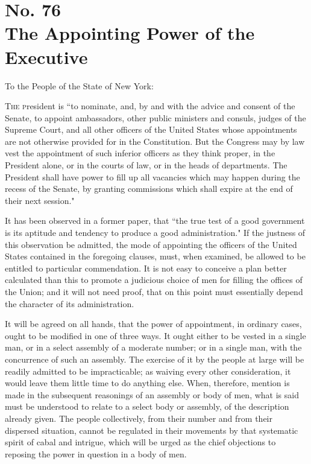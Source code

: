 \chapter[No. 76: The Appointing Power of the Executive]{No. 76\\ {\small The Appointing Power of the Executive}}
To the People of the State of New York:
\vspace{.25cm}

\textsc{The p}resident is ``to nominate, and, by and with the advice and consent of the Senate, to appoint ambassadors, other public ministers and consuls, judges of the Supreme Court, and all other officers of the United States whose appointments are not otherwise provided for in the Constitution. But the Congress may by law vest the appointment of such inferior officers as they think proper, in the President alone, or in the courts of law, or in the heads of departments. The President shall have power to fill up all vacancies which may happen during the recess of the Senate, by granting commissions which shall expire at the end of their next session."

It has been observed in a former paper, that ``the true test of a good government is its aptitude and tendency to produce a good administration." If the justness of this observation be admitted, the mode of appointing the officers of the United States contained in the foregoing clauses, must, when examined, be allowed to be entitled to particular commendation. It is not easy to conceive a plan better calculated than this to promote a judicious choice of men for filling the offices of the Union; and it will not need proof, that on this point must essentially depend the character of its administration.

It will be agreed on all hands, that the power of appointment, in ordinary cases, ought to be modified in one of three ways. It ought either to be vested in a single man, or in a select assembly of a moderate number; or in a single man, with the concurrence of such an assembly. The exercise of it by the people at large will be readily admitted to be impracticable; as waiving every other consideration, it would leave them little time to do anything else. When, therefore, mention is made in the subsequent reasonings of an assembly or body of men, what is said must be understood to relate to a select body or assembly, of the description already given. The people collectively, from their number and from their dispersed situation, cannot be regulated in their movements by that systematic spirit of cabal and intrigue, which will be urged as the chief objections to reposing the power in question in a body of men.

